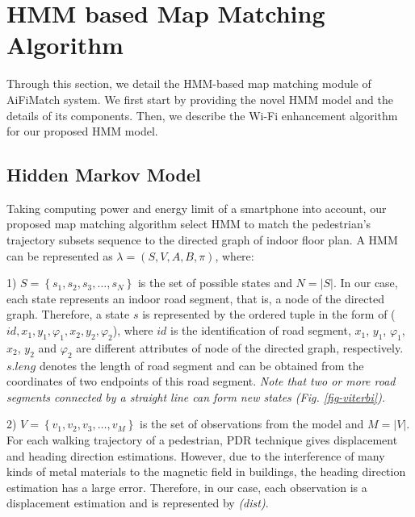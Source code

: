 \documentclass{llncs}
\begin{document}
\section{HMM based Map Matching Algorithm}

Through this section, we detail the HMM-based map matching module of AiFiMatch system. We first start by providing the novel HMM model and the details of its components. Then, we describe the Wi-Fi enhancement algorithm for our proposed HMM model.

\subsection{Hidden Markov Model}

Taking computing power and energy limit of a smartphone into account, our proposed map matching algorithm select HMM to match the pedestrian's trajectory subsets sequence to the directed graph of indoor floor plan. A HMM can be represented as $\lambda  = (S,V,A,B,\pi)$, where:

1) $S = \left\{ {{s_1},{s_2},{s_3}, \ldots ,{s_N}} \right\}$ is the set of possible states and $N = \left| S \right|$. In our case, each state represents an indoor road segment, that is, a node of the directed graph. Therefore, a state $s$ is represented by the ordered tuple in the form of ($id,x_{1},y_{1},{\varphi}_{1},x_{2},y_{2},{\varphi}_{2}$), where $id$ is the identification of road segment, $x_{1}$, $y_{1}$, ${\varphi}_{1}$, $x_{2}$, $y_{2}$ and ${\varphi}_{2}$ are different attributes of node of the directed graph, respectively. $s.leng$ denotes the length of road segment and can be obtained from the coordinates of two endpoints of this road segment. \emph{Note that two or more road segments connected by a straight line can form new states (Fig. \ref{fig-viterbi}).}

2) $V = \left\{ {{v_1},{v_2},{v_3}, \ldots ,{v_M}} \right\}$ is the set of observations from the model and $M = \left| V \right|$. For each walking trajectory of a pedestrian, PDR technique gives displacement and heading direction estimations. However, due to the interference of many kinds of metal materials to the magnetic field in buildings, the heading direction estimation has a large error. Therefore, in our case, each observation is a displacement estimation and is represented by \emph{(dist)}.
\end{document}
